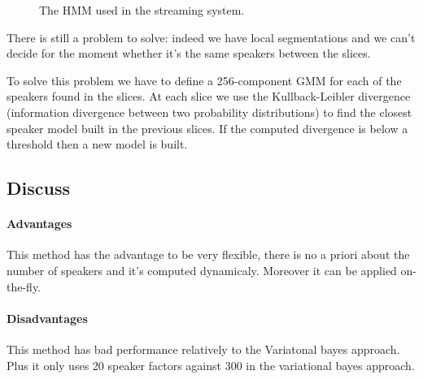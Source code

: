 \documentclass{techrep} %
\begin{document}
\begin{figure}[H]
  \begin{center}
  \end{center}
  \label{hmmstream}
  \caption{The HMM used in the streaming system.}
\end{figure}

There is still a problem to solve: indeed we have local segmentations
and we can't decide for the moment whether it's the same speakers between
the slices.

To solve this problem we have to define a 256-component GMM for each
of the speakers found in the slices.  At each slice we use the
Kullback-Leibler divergence (information divergence between two
probability distributions) to find the closest speaker model built in
the previous slices.  If the computed divergence is below a threshold
then a new model is built.

\subsection{Discuss}

\paragraph{Advantages} This method has the advantage to be very flexible, there is no a priori about the number of speakers and it's computed dynamicaly. Moreover it can be applied on-the-fly.

\paragraph{Disadvantages} This method has bad performance relatively to the Variatonal bayes approach. Plus it only uses 20 speaker factors against 300 in the variational bayes approach.
\end{document}
